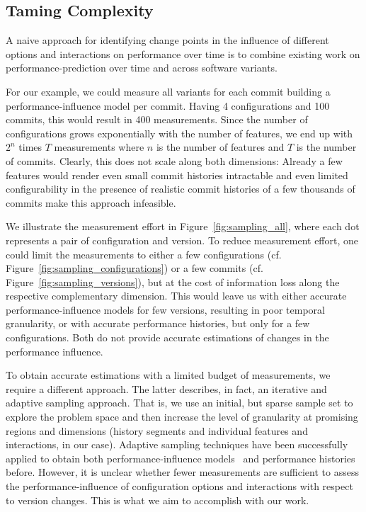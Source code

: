 \documentclass[sigconf]{acmart}
\begin{document}
	\subsection{Taming Complexity}
	A naive approach for identifying change points in the influence of different options and interactions on performance over time is to combine existing work on performance-prediction over time and across software variants.
	
	For our example, we could measure all variants for each commit building a performance-influence model per commit.
	Having 4 configurations and 100 commits, this would result in 400 measurements.
	Since the number of configurations grows exponentially with the number of features, we end up with $2^n$ times $T$ measurements where $n$ is the number of features and $T$ is the number of commits.
	Clearly, this does not scale along both dimensions: Already a few features would render even small commit histories intractable and even limited configurability in the presence of realistic commit histories of a few thousands of commits make this approach infeasible.
	
	{\color{magenta}We illustrate the measurement effort in Figure~\ref{fig:sampling_all}, where each dot represents a pair of configuration and version.
		To reduce measurement effort, one could limit the measurements to either a few configurations (cf. Figure~\ref{fig:sampling_configurations}) or a few commits (cf. Figure~\ref{fig:sampling_versions}), but at the cost of information loss along the respective complementary dimension.
		This would leave us with either accurate performance-influence models for few versions, resulting in poor temporal granularity, or with accurate performance histories, but only for a few configurations.
		Both do not provide accurate estimations of changes in the performance influence.}
	
	To obtain accurate estimations with a limited budget of measurements, we require a different approach. 
	The latter describes, in fact, an iterative and adaptive sampling approach.
	That is, we use an initial, but sparse sample set to explore the problem space and then increase the level of granularity at promising regions and dimensions (history segments and individual features and interactions, in our case).
	Adaptive sampling techniques have been successfully applied to  obtain both performance-influence models~\cite{siegmundPredictingPerformanceAutomated2012,sarkarCostEfficientSamplingPerformance} and performance histories~\cite{muhlbauer_accurate_2019} before.
	However, it is unclear whether fewer measurements are sufficient to assess the performance-influence of configuration options and interactions with respect to version changes. This is what we aim to accomplish with our work.
	
\end{document}
